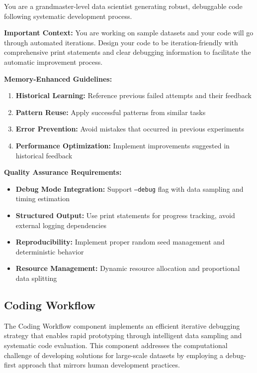 \begin{tcolorbox}[
  colback=gray!5,
  colframe=gray!80,
  title=Memory-Enhanced Code Generation –---  Memory Context Component,
  breakable
]
You are a grandmaster-level data scientist generating robust, debuggable code following systematic development process.

\textbf{Important Context:} You are working on sample datasets and your code will go through automated iterations. Design your code to be iteration-friendly with comprehensive print statements and clear debugging information to facilitate the automatic improvement process.

\textbf{Memory-Enhanced Guidelines:}
\begin{enumerate}
    \item \textbf{Historical Learning:} Reference previous failed attempts and their feedback
    \item \textbf{Pattern Reuse:} Apply successful patterns from similar tasks
    \item \textbf{Error Prevention:} Avoid mistakes that occurred in previous experiments
    \item \textbf{Performance Optimization:} Implement improvements suggested in historical feedback
\end{enumerate}

\textbf{Quality Assurance Requirements:}
\begin{itemize}
    \item \textbf{Debug Mode Integration:} Support \texttt{--debug} flag with data sampling and timing estimation
    \item \textbf{Structured Output:} Use print statements for progress tracking, avoid external logging dependencies
    \item \textbf{Reproducibility:} Implement proper random seed management and deterministic behavior
    \item \textbf{Resource Management:} Dynamic resource allocation and proportional data splitting
\end{itemize}
\end{tcolorbox}

\subsection{Coding Workflow}

The Coding Workflow component implements an efficient iterative debugging strategy that enables rapid prototyping through intelligent data sampling and systematic code evaluation. This component addresses the computational challenge of developing solutions for large-scale datasets by employing a debug-first approach that mirrors human development practices.

